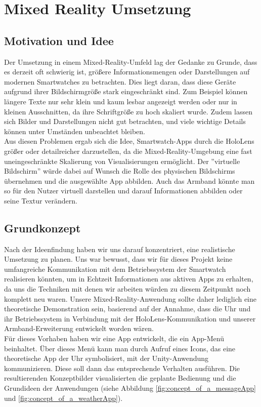 \documentclass[11pt, a4paper]{article}
\begin{document}
\newpage

\section{Mixed Reality Umsetzung}

\subsection{Motivation und Idee} \label{motivation_and_idea}

Der Umsetzung in einem Mixed-Reality-Umfeld lag der Gedanke zu Grunde, dass es derzeit oft schwierig ist, größere Informationsmengen oder Darstellungen auf modernen Smartwatches zu betrachten. Dies liegt daran, dass diese Geräte aufgrund ihrer Bildschirmgröße stark eingeschränkt sind. Zum Beispiel können längere Texte nur sehr klein und kaum lesbar angezeigt werden oder nur in kleinen Ausschnitten, da ihre Schriftgröße zu hoch skaliert wurde. Zudem lassen sich Bilder und Darstellungen nicht gut betrachten, und viele wichtige Details können unter Umständen unbeachtet bleiben. \\
Aus diesen Problemen ergab sich die Idee, Smartwatch-Apps durch die HoloLens größer oder detailreicher darzustellen, da die Mixed-Reality-Umgebung eine fast uneingeschränkte Skalierung von Visualisierungen ermöglicht. Der ''virtuelle Bildschirm''    würde dabei auf Wunsch die Rolle des physischen Bildschirms übernehmen und die ausgewählte App abbilden. Auch das Armband könnte man so für den Nutzer virtuell darstellen und darauf Informationen abbilden oder seine Textur verändern.

\subsection{Grundkonzept}

Nach der Ideenfindung haben wir uns darauf konzentriert, eine realistische Umsetzung zu planen. Uns war bewusst, dass wir für dieses Projekt keine umfangreiche Kommunikation mit dem Betriebssystem der Smartwatch realisieren könnten, um in Echtzeit Informationen aus aktiven Apps zu erhalten, da uns die Techniken mit denen wir arbeiten würden zu diesem Zeitpunkt noch komplett neu waren. Unsere Mixed-Reality-Anwendung sollte daher lediglich eine theoretische Demonstration sein, basierend auf der Annahme, dass die Uhr und ihr Betriebssystem in Verbindung mit der HoloLens-Kommunikation und unserer Armband-Erweiterung entwickelt worden wären. \\
Für dieses Vorhaben haben wir eine App entwickelt, die ein App-Menü beinhaltet. Über dieses Menü kann man durch Aufruf eines Icons, das eine theoretische App der Uhr symbolisiert, mit der Unity-Anwendung kommunizieren. Diese soll dann das entsprechende Verhalten ausführen. Die resultierenden Konzeptbilder visualisierten die geplante Bedienung und die Grundideen der Anwendungen (siehe Abbildung \ref{fig:concept_of_a_messageApp} und \ref{fig:concept_of_a_weatherApp}).
\end{document}
